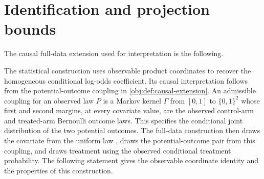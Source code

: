 \section{Identification and projection bounds}

The causal full-data extension used for interpretation is the following.

The statistical construction uses observable product coordinates to recover the homogeneous conditional log-odds coefficient. Its causal interpretation follows from the potential-outcome coupling in \cref{obj:def:causal-extension}. An admissible coupling for an observed law \(P\) is a Markov kernel \(\Gamma\) from \([0,1]\) to \(\{0,1\}^2\) whose first and second margins, at every covariate value, are the observed control-arm and treated-arm Bernoulli outcome laws. This specifies the conditional joint distribution of the two potential outcomes. The full-data construction then draws the covariate from the uniform law , draws the potential-outcome pair from this coupling, and draws treatment using the observed conditional treatment probability. The following statement gives the observable coordinate identity and the properties of this construction.

